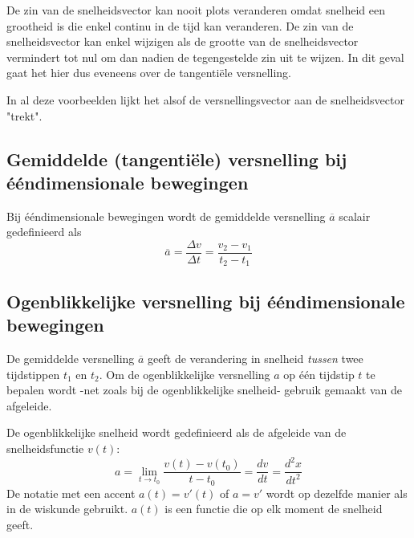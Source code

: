 \documentclass{ximera}
\begin{document}
\begin{remark}
De zin van de snelheidsvector kan nooit plots veranderen omdat snelheid een grootheid is die enkel continu in de tijd kan veranderen. De zin van de snelheidsvector kan enkel wijzigen als de grootte van de snelheidsvector vermindert tot nul om dan nadien de tegengestelde zin uit te wijzen. In dit geval gaat het hier dus eveneens over de tangentiële versnelling.
\end{remark}


In al deze voorbeelden lijkt het alsof de versnellingsvector aan de snelheidsvector "trekt".

\subsection*{Gemiddelde (tangentiële) versnelling bij ééndimensionale bewegingen}

\begin{definition}

Bij ééndimensionale bewegingen wordt de gemiddelde versnelling \(\overline{a}\) scalair gedefinieerd als
\[
\overline{a}=\frac{\Delta v}{\Delta t}=\frac{v_2-v_1}{t_2-t_1}
\]
\end{definition}

\subsection*{Ogenblikkelijke versnelling bij ééndimensionale bewegingen}

De gemiddelde versnelling \(\overline{a}\) geeft de verandering in snelheid \textit{tussen} twee tijdstippen \(t_1\) en \(t_2\).  Om de ogenblikkelijke versnelling \(a\) op één tijdstip \(t\) te bepalen wordt -net zoals bij de ogenblikkelijke snelheid- gebruik gemaakt van de afgeleide. 

\begin{definition}
	De ogenblikkelijke snelheid wordt gedefinieerd als de afgeleide van de snelheidsfunctie \(v(t)\):
	\[
		a=\lim_{t\to t_0}\frac{v(t)-v(t_0)}{t-t_0} = \frac{dv}{dt}=\frac{d^2x}{dt^2}
		\]
		De notatie met een accent $a(t)=v'(t)$ of $a=v'$ wordt op dezelfde manier als in de wiskunde gebruikt. $a(t)$ is een functie die op elk moment de snelheid geeft. 
	\end{definition}
	
\end{document}
